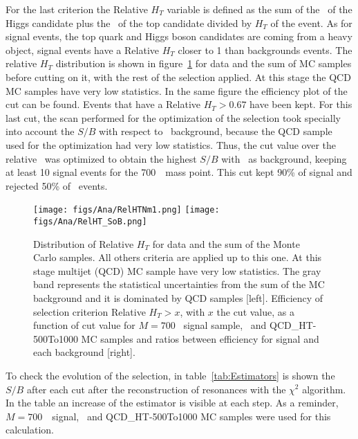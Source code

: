 For the last criterion the Relative $H_{T}$ variable is defined as the sum of the \pt~of the Higgs candidate plus the \pt~of the top candidate divided by $H_{T}$ of the event. As for signal events, the top quark and Higgs boson candidates are coming from a heavy object, signal events have a Relative $H_{T}$ closer to 1 than backgrounds events. The relative $H_{T}$ distribution is shown in figure~\ref{fig:RelHtMass} for data and the sum of MC samples before cutting on it, with the rest of the selection applied. At this stage the QCD MC samples have very low statistics. In the same figure the efficiency plot of the cut can be found. Events that have a Relative $H_{T}>0.67$ have been kept. For this last cut, the scan performed for the optimization of the selection took specially into account the $S/B$ with respect to \ttbar~background, because the QCD sample used for the optimization had very low statistics. Thus, the cut value over the relative \HT~was optimized to obtain the highest $S/B$ with \ttbar~as background, keeping at least 10 signal events for the 700~\GeVcc~mass point. This cut kept 90\% of signal and rejected 50\% of \ttbar~events.

\begin{figure}[!Hhtbp]
  \begin{center}
    \texttt{[image: figs/Ana/RelHTNm1.png]}
    \texttt{[image: figs/Ana/RelHT\_SoB.png]}
    \caption{Distribution of Relative $H_{T}$ for data and the sum of the Monte Carlo samples. All others criteria are applied up to this one. At this stage multijet (QCD) MC sample have very low statistics. The gray band represents the statistical uncertainties from the sum of the MC background and it is dominated by QCD samples [left]. Efficiency of selection criterion Relative $H_{T}>x$, with $x$ the cut value, as a function of cut value for $M=700$ \GeVcc~signal sample, \ttbar~and QCD\_HT-500To1000 MC samples and ratios between efficiency for signal and each background [right]. }
    \label{fig:RelHtMass}
  \end{center}
\end{figure}

To check the evolution of the selection, in table~\ref{tab:Estimators} is shown the $S/B$ after each cut after the reconstruction of resonances with the $\chi^{2}$ algorithm. In the table an increase of the estimator is visible at each step. As a reminder, ${M=700}$~\GeVcc~signal, \ttbar~and QCD\_HT-500To1000 MC samples were used for this calculation. %

